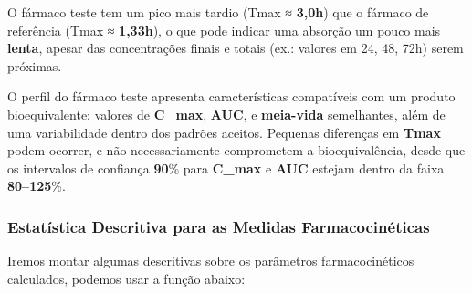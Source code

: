 \documentclass[
]{article}
\begin{document}
O fármaco teste tem um pico mais tardio (Tmax ≈ \textbf{3,0h}) que o
fármaco de referência (Tmax ≈ \textbf{1,33h}), o que pode indicar uma
absorção um pouco mais \textbf{lenta}, apesar das concentrações finais e
totais (ex.: valores em 24, 48, 72h) serem próximas.

O perfil do fármaco teste apresenta características compatíveis com um
produto bioequivalente: valores de \textbf{C\_max}, \textbf{AUC}, e
\textbf{meia-vida} semelhantes, além de uma variabilidade dentro dos
padrões aceitos. Pequenas diferenças em \textbf{Tmax} podem ocorrer, e
não necessariamente comprometem a bioequivalência, desde que os
intervalos de confiança \textbf{90}\% para \textbf{C\_max} e
\textbf{AUC} estejam dentro da faixa \textbf{80--125}\%.

\hypertarget{estatuxedstica-descritiva-para-as-medidas-farmacocinuxe9ticas}{%
\subsubsection{Estatística Descritiva para as Medidas
Farmacocinéticas}\label{estatuxedstica-descritiva-para-as-medidas-farmacocinuxe9ticas}}

Iremos montar algumas descritivas sobre os parâmetros farmacocinéticos
calculados, podemos usar a função abaixo:
\end{document}
